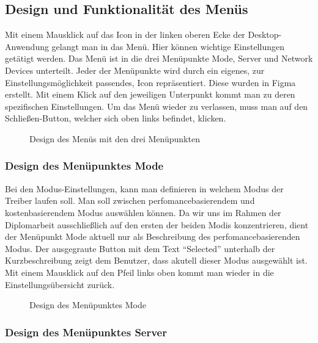 \subsection{Design und Funktionalität des Menüs}
Mit einem Mausklick auf das Icon in der linken oberen Ecke der Desktop-Anwendung gelangt man in das Menü. Hier können wichtige Einstellungen getätigt werden. Das Menü ist in die drei Menüpunkte Mode, Server und Network Devices unterteilt. Jeder der Menüpunkte wird durch ein eigenes, zur Einstellungsmöglichkeit passendes, Icon repräsentiert. Diese wurden in Figma erstellt. Mit einem Klick auf den jeweiligen Unterpunkt kommt man zu deren spezifischen Einstellungen. Um das Menü wieder zu verlassen, muss man auf den Schließen-Button, welcher sich oben links befindet, klicken.
\\
\begin{figure}[H]
    \centering
    \setlength{\fboxsep}{1pt}
	\setlength{\fboxrule}{1pt}
    \caption[Design des Menüs mit den drei Menüpunkten]{Design des Menüs mit den drei Menüpunkten} 
\end{figure}

\pagebreak
\subsubsection{Design des Menüpunktes Mode}

Bei den Modus-Einstellungen, kann man definieren in welchem Modus der Treiber laufen soll. Man soll zwischen perfomancebasierendem und kostenbasierendem Modus auswählen können. Da wir uns im Rahmen der Diplomarbeit ausschließlich auf den ersten der beiden Modis konzentrieren, dient der Menüpunkt Mode aktuell nur als Beschreibung des perfomancebasierenden Modus. Der ausgegraute Button mit dem Text “Selected” unterhalb der Kurzbeschreibung zeigt dem Benutzer, dass akutell dieser Modus ausgewählt ist. Mit einem Mausklick auf den Pfeil links oben kommt man wieder in die Einstellungsübersicht zurück.
\\
\begin{figure}[H]
    \centering
    \setlength{\fboxsep}{1pt}
	\setlength{\fboxrule}{1pt}
    \caption[Design des Menüpunktes Mode]{Design des Menüpunktes Mode} 
\end{figure}

\subsubsection{Design des Menüpunktes Server}

